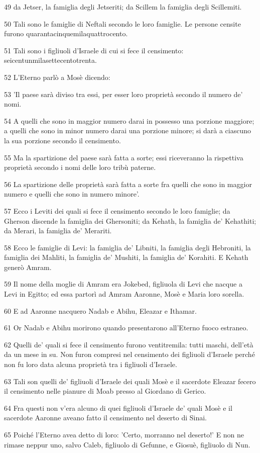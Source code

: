 \par 49 da Jetser, la famiglia degli Jetseriti; da Scillem la famiglia degli Scillemiti.
\par 50 Tali sono le famiglie di Neftali secondo le loro famiglie. Le persone censite furono quarantacinquemilaquattrocento.
\par 51 Tali sono i figliuoli d'Israele di cui si fece il censimento: seicentunmilasettecentotrenta.
\par 52 L'Eterno parlò a Mosè dicendo:
\par 53 'Il paese sarà diviso tra essi, per esser loro proprietà secondo il numero de' nomi.
\par 54 A quelli che sono in maggior numero darai in possesso una porzione maggiore; a quelli che sono in minor numero darai una porzione minore; si darà a ciascuno la sua porzione secondo il censimento.
\par 55 Ma la spartizione del paese sarà fatta a sorte; essi riceveranno la rispettiva proprietà secondo i nomi delle loro tribù paterne.
\par 56 La spartizione delle proprietà sarà fatta a sorte fra quelli che sono in maggior numero e quelli che sono in numero minore'.
\par 57 Ecco i Leviti dei quali si fece il censimento secondo le loro famiglie; da Gherson discende la famiglia dei Ghersoniti; da Kehath, la famiglia de' Kehathiti; da Merari, la famiglia de' Merariti.
\par 58 Ecco le famiglie di Levi: la famiglia de' Libniti, la famiglia degli Hebroniti, la famiglia dei Mahliti, la famiglia de' Mushiti, la famiglia de' Korahiti. E Kehath generò Amram.
\par 59 Il nome della moglie di Amram era Jokebed, figliuola di Levi che nacque a Levi in Egitto; ed essa partorì ad Amram Aaronne, Mosè e Maria loro sorella.
\par 60 E ad Aaronne nacquero Nadab e Abihu, Eleazar e Ithamar.
\par 61 Or Nadab e Abihu morirono quando presentarono all'Eterno fuoco estraneo.
\par 62 Quelli de' quali si fece il censimento furono ventitremila: tutti maschi, dell'età da un mese in su. Non furon compresi nel censimento dei figliuoli d'Israele perché non fu loro data alcuna proprietà tra i figliuoli d'Israele.
\par 63 Tali son quelli de' figliuoli d'Israele dei quali Mosè e il sacerdote Eleazar fecero il censimento nelle pianure di Moab presso al Giordano di Gerico.
\par 64 Fra questi non v'era alcuno di quei figliuoli d'Israele de' quali Mosè e il sacerdote Aaronne aveano fatto il censimento nel deserto di Sinai.
\par 65 Poiché l'Eterno avea detto di loro: 'Certo, morranno nel deserto!' E non ne rimase neppur uno, salvo Caleb, figliuolo di Gefunne, e Giosuè, figliuolo di Nun.

